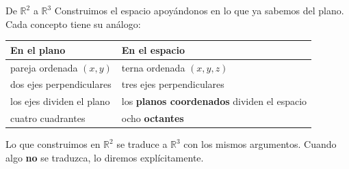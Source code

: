 \documentclass[aspectratio=169,10pt]{beamer}
\newcommand{\destaca}[1]{%
  \par\vspace{3pt}\noindent
  \colorbox{turquesaClaro}{%
    \parbox{\dimexpr\linewidth-2\fboxsep\relax}{\vspace{3pt}#1\vspace{3pt}}}%
  \par\vspace{3pt}}
\begin{document}
\begin{frame}{De $\mathbb{R}^2$ a $\mathbb{R}^3$}
  Construimos el espacio apoyándonos en lo que ya sabemos del plano.
  Cada concepto tiene su análogo:
  
  \vspace{0.2cm}
  \begin{center}
  {\small
  \begin{tabular}{@{}ll@{}}
    \toprule
    \textbf{En el plano} & \textbf{En el espacio} \\
    \midrule
    pareja ordenada $(x,y)$ & terna ordenada $(x,y,z)$ \\
    dos ejes perpendiculares & tres ejes perpendiculares \\
    los ejes dividen el plano & los \textbf{planos coordenados}
      dividen el espacio \\
    cuatro cuadrantes & ocho \textbf{octantes} \\
    \bottomrule
  \end{tabular}}
  \end{center}
  
  \vspace{0.3cm}
  \destaca{Lo que construimos en $\mathbb{R}^2$ se
  traduce a $\mathbb{R}^3$ con los mismos argumentos. Cuando algo
  \textbf{no} se traduzca, lo diremos explícitamente.}
\end{frame}
\end{document}
